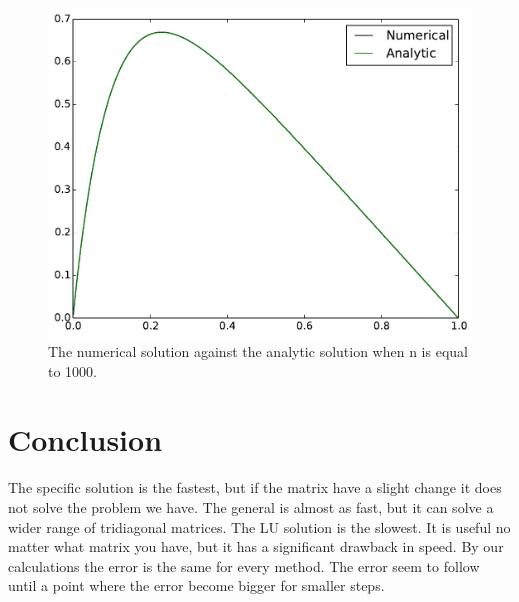 \documentclass[12pt,norsk,a4paper]{article}
\begin{document}
\begin{figure}[H]
	\centering
	\includegraphics[width=0.7\linewidth]{bilder/n1000}
	\caption{The numerical solution against the analytic solution when n is equal to 1000.}
	\label{fig:n1000}
\end{figure}














\section{Conclusion}
The specific solution is the fastest, but if the matrix have a slight change it does not solve the problem we have. The general is almost as fast, but it can solve a wider range of tridiagonal matrices. The LU solution is the slowest. It is useful no matter what matrix you have, but it has a significant drawback in speed. By our calculations the error is the same for every method. The error seem to follow until a point where the error become bigger for smaller steps. 



















\end{document}

